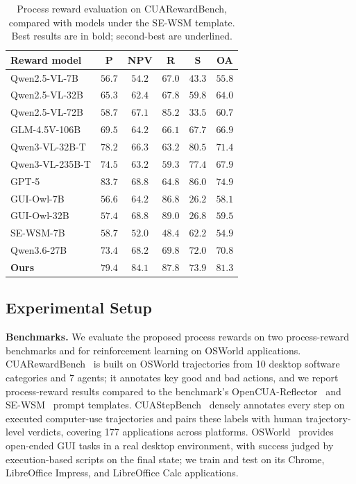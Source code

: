 \begin{table}[t]
\caption{Process reward evaluation on CUARewardBench, compared with models under the SE-WSM template. Best results are in bold; second-best are underlined.}
\label{tab:cuarewardbench-sewsm}
\centering
\small
\begin{tabular}{lccccc}
\toprule
Reward model & P & NPV & R & S & OA \\
\midrule
Qwen2.5-VL-7B & $56.7$ & $54.2$ & $67.0$ & $43.3$ & $55.8$ \\
Qwen2.5-VL-32B & $65.3$ & $62.4$ & $67.8$ & $59.8$ & $64.0$ \\
Qwen2.5-VL-72B & $58.7$ & $67.1$ & $85.2$ & $33.5$ & $60.7$ \\
GLM-4.5V-106B & $69.5$ & $64.2$ & $66.1$ & $67.7$ & $66.9$ \\
Qwen3-VL-32B-T & $78.2$ & $66.3$ & $63.2$ & \underline{$80.5$} & $71.4$ \\
Qwen3-VL-235B-T & $74.5$ & $63.2$ & $59.3$ & $77.4$ & $67.9$ \\
GPT-5 & $\mathbf{83.7}$ & \underline{$68.8$} & $64.8$ & $\mathbf{86.0}$ & \underline{$74.9$} \\
GUI-Owl-7B & $56.6$ & $64.2$ & $86.8$ & $26.2$ & $58.1$ \\
GUI-Owl-32B & $57.4$ & \underline{$68.8$} & $\mathbf{89.0}$ & $26.8$ & $59.5$ \\
SE-WSM-7B & $58.7$ & $52.0$ & $48.4$ & $62.2$ & $54.9$ \\
Qwen3.6-27B & $73.4$ & $68.2$ & $69.8$ & $72.0$ & $70.8$ \\
\textbf{Ours} & \underline{$79.4$} & $\mathbf{84.1}$ & \underline{$87.8$} & $73.9$ & $\mathbf{81.3}$ \\
\bottomrule
\end{tabular}
\end{table}

\subsection{Experimental Setup}
\label{sec:exp-setup}

\textbf{Benchmarks.}
We evaluate the proposed process rewards on two process-reward benchmarks and for reinforcement learning on OSWorld applications.
CUARewardBench~\cite{lin2026cuarewardbench} is built on OSWorld trajectories from 10 desktop software categories and 7 agents; it annotates key good and bad actions, and we report process-reward results compared to the benchmark's OpenCUA-Reflector~\cite{wang2025opencuaopenfoundationscomputeruse} and SE-WSM~\cite{sun2025seagent} prompt templates.
CUAStepBench~\cite{wan2026seekjudge} densely annotates every step on executed computer-use trajectories and pairs these labels with human trajectory-level verdicts, covering 177 applications across platforms.
OSWorld~\cite{xie2025osworld} provides open-ended GUI tasks in a real desktop environment, with success judged by execution-based scripts on the final state; we train and test on its Chrome, LibreOffice Impress, and LibreOffice Calc applications.

